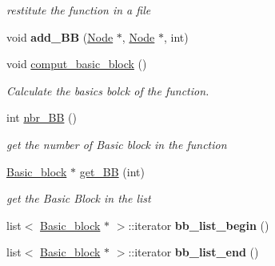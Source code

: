 \begin{DoxyCompactItemize}
\begin{DoxyCompactList}\small\item\em restitute the function in a file \end{DoxyCompactList}\item 
\hypertarget{classFunction_a833adcab24d31a7787a698b8c6cf61d9}{void {\bfseries add\-\_\-\-B\-B} (\hyperlink{classNode}{\-Node} $\ast$, \hyperlink{classNode}{\-Node} $\ast$, int)}\label{classFunction_a833adcab24d31a7787a698b8c6cf61d9}

\item 
\hypertarget{classFunction_a6094f123294ccbb891fa4145fd5b1b0a}{void \hyperlink{classFunction_a6094f123294ccbb891fa4145fd5b1b0a}{comput\-\_\-basic\-\_\-block} ()}\label{classFunction_a6094f123294ccbb891fa4145fd5b1b0a}

\begin{DoxyCompactList}\small\item\em \-Calculate the basics bolck of the function. \end{DoxyCompactList}\item 
\hypertarget{classFunction_a4ddde4ac1ff488dfcbfcaee71f727a48}{int \hyperlink{classFunction_a4ddde4ac1ff488dfcbfcaee71f727a48}{nbr\-\_\-\-B\-B} ()}\label{classFunction_a4ddde4ac1ff488dfcbfcaee71f727a48}

\begin{DoxyCompactList}\small\item\em get the number of \-Basic block in the function \end{DoxyCompactList}\item 
\hypertarget{classFunction_ae11968b8ca5497526e9448b67823d373}{\hyperlink{classBasic__block}{\-Basic\-\_\-block} $\ast$ \hyperlink{classFunction_ae11968b8ca5497526e9448b67823d373}{get\-\_\-\-B\-B} (int)}\label{classFunction_ae11968b8ca5497526e9448b67823d373}

\begin{DoxyCompactList}\small\item\em get the \-Basic \-Block in the list \end{DoxyCompactList}\item 
\hypertarget{classFunction_a18797dfd75ba34acf0e73b69da8311ec}{list$<$ \hyperlink{classBasic__block}{\-Basic\-\_\-block} $\ast$ $>$\-::iterator {\bfseries bb\-\_\-list\-\_\-begin} ()}\label{classFunction_a18797dfd75ba34acf0e73b69da8311ec}

\item 
\hypertarget{classFunction_a06be1b0a730b4ead3da6bb5529df9788}{list$<$ \hyperlink{classBasic__block}{\-Basic\-\_\-block} $\ast$ $>$\-::iterator {\bfseries bb\-\_\-list\-\_\-end} ()}\label{classFunction_a06be1b0a730b4ead3da6bb5529df9788}


\end{DoxyCompactItemize}
